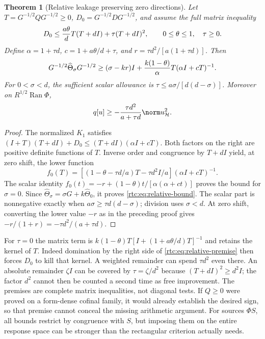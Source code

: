 \documentclass[11pt,a4paper]{article}
\numberwithin{equation}{section}
\newtheorem{theorem}{Theorem}[section]
\theoremstyle{definition}\newtheorem{definition}[theorem]{Definition}
\theoremstyle{remark}\newtheorem{remark}[theorem]{Remark}
\newcommand{\Hh}{\mathcal H}\newcommand{\Hw}{\mathcal H}
\begin{document}
\begin{theorem}[Relative leakage preserving zero directions]\label{rtc:thm:relative}
Let $T=G^{-1/2}QG^{-1/2}\ge0$, $D_0=G^{-1/2}DG^{-1/2}$, and assume the
full matrix inequality
\begin{equation}\label{rtc:eq:relative-premise}
 D_0\le{a\theta\over d}T(T+dI)+\tau(T+dI)^2,
 \qquad 0\le\theta\le1,\quad\tau\ge0.
\end{equation}
Define $\alpha=1+\tau d$, $c=1+a\theta/d+\tau$, and
$r=\tau d^2/[a(1+\tau d)]$. Then
\begin{equation}\label{rtc:eq:relative-bound}
 G^{-1/2}\widehat\Theta_\sigma G^{-1/2}
 \ge(\sigma-kr)I+{k(1-\theta)\over\alpha}
                      T(\alpha I+cT)^{-1}.
\end{equation}
For $0<\sigma<d$, the sufficient scalar allowance is
$\tau\le a\sigma/[d(d-\sigma)]$.
Moreover on $R^{1/2}\operatorname{Ran}\Phi$,
\begin{equation}\label{rtc:eq:relative-physical}
 q[u]\ge-{\tau d^2\over a+\tau d}\norm u_{\Hh}^2.
\end{equation}
\end{theorem}
\begin{proof}
The normalized $K_1$ satisfies
$(I+T)(T+dI)+D_0\le(T+dI)(\alpha I+cT)$.
Both factors on the right are positive definite functions of $T$.
Inverse order and congruence by $T+dI$ yield, at zero shift, the lower
function
\[
 f_0(T)=[(1-\theta-\tau d/a)T-\tau d^2I/a](\alpha I+cT)^{-1}.
\]
The scalar identity
$f_0(t)=-r+(1-\theta)t/[\alpha(\alpha+ct)]$
proves the bound for $\sigma=0$.
Since $\widehat\Theta_\sigma=\sigma G+k\widehat\Theta_0$, it proves
\eqref{rtc:eq:relative-bound}. The scalar part is nonnegative exactly
when $a\sigma\ge\tau d(d-\sigma)$; division uses $\sigma<d$.
At zero shift, converting the lower value $-r$ as in the preceding proof
gives $-r/(1+r)=-\tau d^2/(a+\tau d)$.
\end{proof}
For $\tau=0$ the matrix term is
$k(1-\theta)T[I+(1+a\theta/d)T]^{-1}$ and retains the kernel of $T$.
Indeed domination by the right side of \eqref{rtc:eq:relative-premise}
then forces $D_0$ to kill that kernel. A weighted remainder can spend
$\tau d^2$ even there. An absolute remainder $\zeta I$ can be covered
by $\tau=\zeta/d^2$ because $(T+dI)^2\ge d^2I$; the factor $d^2$
cannot then be counted a second time as free improvement.
The premises are complete matrix inequalities, not diagonal tests.
If $Q\ge0$ were proved on a form-dense cofinal family, it would already
establish the desired sign, so that premise cannot conceal the missing
arithmetic argument. For sources $\Phi S$, all bounds restrict by
congruence with $S$, but imposing them on the entire response space can
be stronger than the rectangular criterion actually needs.
\end{document}
